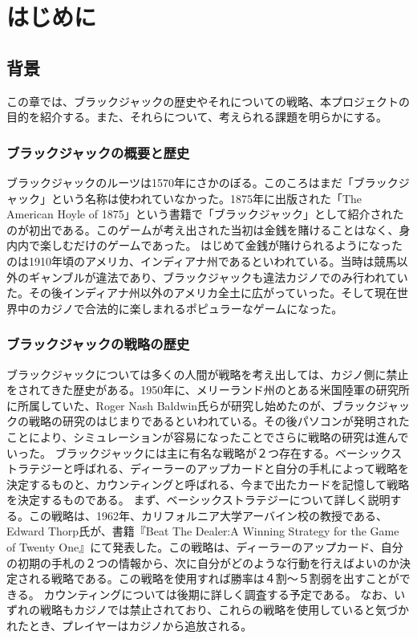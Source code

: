 \chapter{はじめに}
\section{背景}
この章では、ブラックジャックの歴史やそれについての戦略、本プロジェクトの目的を紹介する。また、それらについて、考えられる課題を明らかにする。

\subsection{ブラックジャックの概要と歴史}
ブラックジャックのルーツは1570年にさかのぼる。このころはまだ「ブラックジャック」という名称は使われていなかった。1875年に出版された「The American Hoyle of 1875」という書籍で「ブラックジャック」として紹介されたのが初出である。このゲームが考え出された当初は金銭を賭けることはなく、身内内で楽しむだけのゲームであった。
はじめて金銭が賭けられるようになったのは1910年頃のアメリカ、インディアナ州であるといわれている。当時は競馬以外のギャンブルが違法であり、ブラックジャックも違法カジノでのみ行われていた。その後インディアナ州以外のアメリカ全土に広がっていった。そして現在世界中のカジノで合法的に楽しまれるポピュラーなゲームになった。

\subsection{ブラックジャックの戦略の歴史}
ブラックジャックについては多くの人間が戦略を考え出しては、カジノ側に禁止をされてきた歴史がある。1950年に、メリーランド州のとある米国陸軍の研究所に所属していた、Roger Nash Baldwin氏らが研究し始めたのが、ブラックジャックの戦略の研究のはじまりであるといわれている。その後パソコンが発明されたことにより、シミュレーションが容易になったことでさらに戦略の研究は進んでいった。
ブラックジャックには主に有名な戦略が２つ存在する。ベーシックストラテジーと呼ばれる、ディーラーのアップカードと自分の手札によって戦略を決定するものと、カウンティングと呼ばれる、今まで出たカードを記憶して戦略を決定するものである。
まず、ベーシックストラテジーについて詳しく説明する。この戦略は、1962年、カリフォルニア大学アーバイン校の教授である、Edward Thorp氏が、書籍『Beat The Dealer:A Winning Strategy for the Game of Twenty One』にて発表した。この戦略は、ディーラーのアップカード、自分の初期の手札の２つの情報から、次に自分がどのような行動を行えばよいのか決定される戦略である。この戦略を使用すれば勝率は４割～５割弱を出すことができる。
カウンティングについては後期に詳しく調査する予定である。
なお、いずれの戦略もカジノでは禁止されており、これらの戦略を使用していると気づかれたとき、プレイヤーはカジノから追放される。

